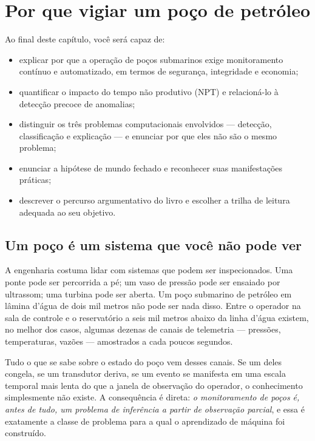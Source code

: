 \chapter{Por que vigiar um poço de petróleo}
\label{cap:introducao}

\begin{objetivos}
Ao final deste capítulo, você será capaz de:
\begin{itemize}[leftmargin=*,itemsep=0.2em]
  \item explicar por que a operação de poços submarinos exige monitoramento contínuo e
        automatizado, em termos de segurança, integridade e economia;
  \item quantificar o impacto do tempo não produtivo (NPT) e relacioná-lo à detecção
        precoce de anomalias;
  \item distinguir os três problemas computacionais envolvidos --- detecção,
        classificação e explicação --- e enunciar por que eles não são o mesmo problema;
  \item enunciar a hipótese de mundo fechado e reconhecer suas manifestações práticas;
  \item descrever o percurso argumentativo do livro e escolher a trilha de leitura
        adequada ao seu objetivo.
\end{itemize}
\end{objetivos}

\section{Um poço é um sistema que você não pode ver}

A engenharia costuma lidar com sistemas que podem ser inspecionados. Uma ponte pode
ser percorrida a pé; um vaso de pressão pode ser ensaiado por ultrassom; uma turbina
pode ser aberta. Um poço submarino de petróleo em lâmina d'água de dois mil metros não
pode ser nada disso. Entre o operador na sala de controle e o reservatório a seis mil
metros abaixo da linha d'água existem, no melhor dos casos, algumas dezenas de canais
de telemetria --- pressões, temperaturas, vazões --- amostrados a cada poucos segundos.

Tudo o que se sabe sobre o estado do poço vem desses canais. Se um deles congela, se
um transdutor deriva, se um evento se manifesta em uma escala temporal mais lenta do
que a janela de observação do operador, o conhecimento simplesmente não existe. A
consequência é direta: \emph{o monitoramento de poços é, antes de tudo, um problema de
inferência a partir de observação parcial}, e essa é exatamente a classe de problema
para a qual o aprendizado de máquina foi construído.

